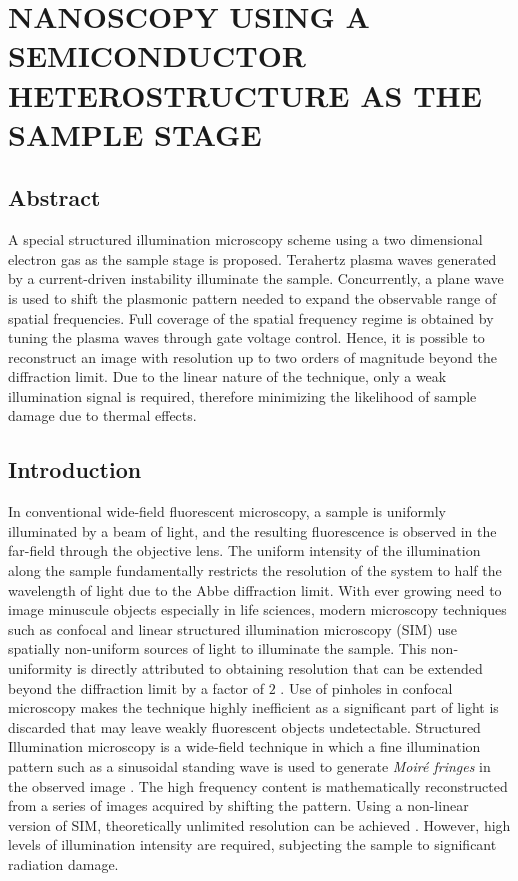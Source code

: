 \chapter{\uppercase{Nanoscopy using a semiconductor heterostructure as the sample stage}}


\section{Abstract}
%
A special structured illumination microscopy scheme using a two dimensional electron gas as the sample stage is proposed. Terahertz plasma waves generated by a current-driven instability illuminate the sample. Concurrently, a plane wave is used to shift the plasmonic pattern needed to expand the observable range of spatial frequencies. Full coverage of the spatial frequency regime is obtained by tuning the plasma waves through gate voltage control. Hence, it is possible to reconstruct an image with resolution up to two orders of magnitude beyond the diffraction limit. Due to the linear nature of the technique, only a weak illumination signal is required, therefore minimizing the likelihood of sample damage due to thermal effects.
%
\section{Introduction}
%
In conventional wide-field fluorescent microscopy, a sample is uniformly illuminated by a beam of light, and the resulting fluorescence is observed in the far-field through the objective lens. The uniform intensity of the illumination along the sample fundamentally restricts the resolution of the system to half the wavelength of light due to the Abbe diffraction limit. With ever growing need to image minuscule objects especially in life sciences, modern microscopy techniques such as confocal and linear structured illumination microscopy (SIM) use spatially non-uniform sources of light to illuminate the sample. This non-uniformity is directly attributed to obtaining resolution that can be extended beyond the diffraction limit by a factor of $2$ \cite{Minsky1988,Gustafsson2000}. Use of pinholes in confocal microscopy makes the technique highly inefficient as a significant part of light is discarded that may leave weakly fluorescent objects undetectable. Structured Illumination microscopy is a wide-field technique in which a fine illumination pattern such as a sinusoidal standing wave is used to generate \emph{Moiré fringes} in the
observed image \cite{Heintzmann1999, Heintzmann2006}. The high frequency content is mathematically reconstructed from a series of images acquired by shifting the pattern. Using a non-linear version of SIM, theoretically unlimited resolution can be achieved \cite{Gustafsson2005}. However, high levels of illumination intensity are required, subjecting the sample to significant radiation damage.

